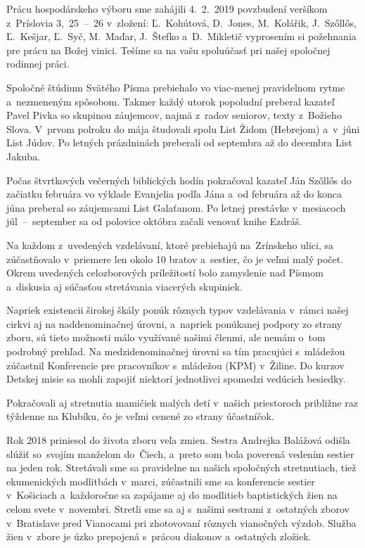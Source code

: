 Prácu hospodárskeho výboru sme zahájili 4.~2.~2019 povzbudení veršíkom z~Príslovia 3,~25~--~26 v~zložení: Ľ.~Kohútová, D.~Jones, M.~Kolářik, J.~Szőllős, Ľ.~Kešjar, Ľ.~Syč, M.~Maďar, J.~Štefko a~D.~Mikletič vyprosením si požehnania pre prácu na Božej vinici. Tešíme sa na vašu spoluúčasť pri našej spoločnej rodinnej práci.



Spoločné štúdium Svätého Písma prebiehalo vo viac-menej pravidelnom rytme a~nezmeneným spôsobom. Takmer každý utorok popoludní preberal kazateľ Pavel Pivka so skupinou záujemcov, najmä z~radov seniorov, texty z~Božieho Slova. V~prvom polroku do mája študovali spolu List Židom (Hebrejom) a~v~júni List Júdov. Po letných prázdninách preberali od septembra až do decembra List Jakuba.

Počas štvrtkových večerných biblických hodín pokračoval kazateľ Ján Szőllős do začiatku februára vo výklade Evanjelia podľa Jána a~od februára až do konca júna preberal so záujemcami List Galaťanom. Po letnej prestávke v~mesiacoch júl~--~september sa od polovice októbra začali venovať knihe Ezdráš.

Na každom z~uvedených vzdelávaní, ktoré prebiehajú na~Zrínskeho ulici, sa zúčastňovalo v~priemere len okolo 10 bratov a~sestier, čo je veľmi malý počet. Okrem uvedených celozborových príležitostí bolo zamyslenie nad Písmom a~diskusia aj súčasťou stretávania viacerých skupiniek.

Napriek existencii širokej škály ponúk rôznych typov vzdelávania v~rámci našej cirkvi aj na naddenominačnej úrovni, a~napriek ponúkanej podpory zo strany zboru, sú tieto možnosti málo využívané našimi členmi, ale nemám o~tom podrobný prehľad. Na medzidenominačnej úrovni sa tím pracujúci s~mládežou zúčastnil Konferencie pre pracovníkov s~mládežou (KPM) v~Žiline. Do kurzov Detskej misie sa mohli zapojiť niektorí jednotlivci spomedzi vedúcich besiedky.

Pokračovali aj stretnutia mamičiek malých detí v~našich priestoroch približne raz týždenne na Klubíku, čo je veľmi cenené zo strany účastníčok.



Rok 2018 priniesol do života zboru veľa zmien. Sestra Andrejka Balážová odišla slúžiť so~svojím manželom do~Čiech, a~preto som bola poverená vedením sestier na jeden rok. Stretávali sme sa pravidelne na našich spoločných stretnutiach, tiež ekumenických modlitbách v~marci, zúčastnili sme sa konferencie sestier v~Košiciach a~každoročne sa zapájame aj do modlitieb  baptistických žien na celom svete v~novembri. Stretli sme sa aj s~našimi sestrami z~ostatných zborov v~Bratislave pred Vianocami pri zhotovovaní rôznych vianočných výzdob. Služba žien v~zbore je úzko prepojená s~prácou diakonov a~ostatných zložiek.

